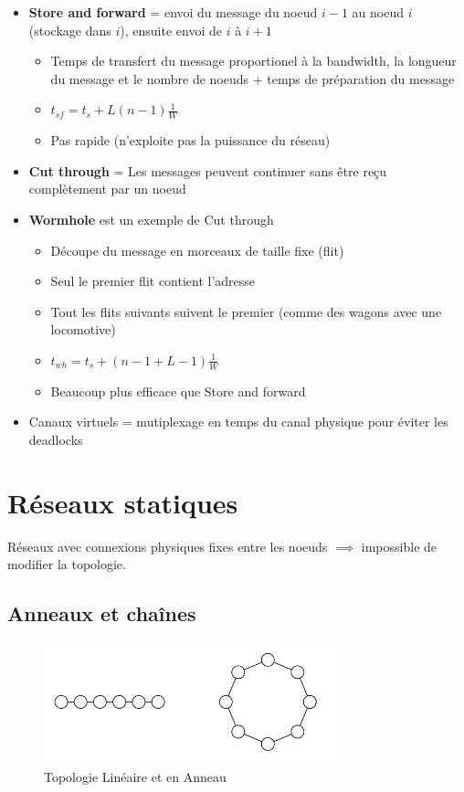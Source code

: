 \documentclass[12pt,a4paper,oneside, titlepage]{article}
\begin{document}
      \begin{itemize}
        \item \textbf{Store and forward} = envoi du message du noeud $i-1$ au noeud $i$ (stockage dans $i$), ensuite envoi de $i$ à $i+1$
        \begin{itemize}
          \item Temps de transfert du message proportionel à la bandwidth, la longueur du message et le nombre de noeuds + temps de préparation du message
          \item $t_{sf}=t_{s} + L (n - 1) \frac{1}{W}$
          \item Pas rapide (n'exploite pas la puissance du réseau)
        \end{itemize}
        \item \textbf{Cut through} = Les messages peuvent continuer sans être reçu complètement par un noeud
        \item \textbf{Wormhole} est un exemple de Cut through
        \begin{itemize}
          \item Découpe du message en morceaux de taille fixe (flit)
          \item Seul le premier flit contient l'adresse
          \item Tout les flits suivants suivent le premier (comme des wagons avec une locomotive)
          \item $t_{wh} = t_{s} + (n - 1 + L - 1) \frac{1}{W}$
          \item Beaucoup plus efficace que Store and forward
        \end{itemize}
        \item Canaux virtuels = mutiplexage en temps du canal physique pour éviter les deadlocks
      \end{itemize}

  \section*{Réseaux statiques}

    Réseaux avec connexions physiques fixes entre les noeuds $\implies$ impossible de modifier la topologie.

    \subsection*{Anneaux et chaînes}

    \begin{figure}[H]
      \centering
      \includegraphics[width=0.75\textwidth]{images/linAnneau}
      \caption{Topologie Linéaire et en Anneau}
    \end{figure}
\end{document}
